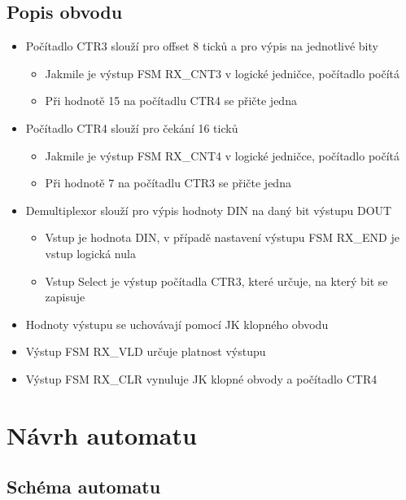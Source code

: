 \documentclass{article}
\begin{document}
	\subsection{Popis obvodu}
	\begin{itemize}
		\item Počítadlo CTR3 slouží pro offset 8 ticků a pro výpis na
				jednotlivé bity
		\begin{itemize}
			\item Jakmile je výstup FSM RX\_CNT3 v logické jedničce,
					počítadlo počítá
			\item Při hodnotě 15 na počítadlu CTR4 se přičte jedna
		\end{itemize}

		\item Počítadlo CTR4 slouží pro čekání 16 ticků
		\begin{itemize}
			\item Jakmile je výstup FSM RX\_CNT4 v logické jedničce,
					počítadlo počítá
			\item Při hodnotě 7 na počítadlu CTR3 se přičte jedna
		\end{itemize}

		\item Demultiplexor slouží pro výpis hodnoty DIN na daný bit
				výstupu DOUT
		\begin{itemize}
			\item Vstup je hodnota DIN, v případě nastavení výstupu FSM
					RX\_END je vstup logická nula
			\item Vstup Select je výstup počítadla CTR3, které určuje, na
					který bit se zapisuje
		\end{itemize}

		\item Hodnoty výstupu se uchovávají pomocí JK klopného obvodu
		\item Výstup FSM RX\_VLD určuje platnost výstupu
		\item Výstup FSM RX\_CLR vynuluje JK klopné obvody a počítadlo CTR4
	\end{itemize}

	\newpage

	\section{Návrh automatu}

	\subsection{Schéma automatu}
\end{document}
